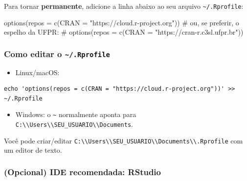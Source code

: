 \documentclass[
  letterpaper,
  DIV=11,
  numbers=noendperiod]{scrreprt}
\newenvironment{Shaded}{\begin{snugshade}}{\end{snugshade}}
\newcommand{\AttributeTok}[1]{\textcolor[rgb]{0.40,0.45,0.13}{#1}}
\newcommand{\CommentTok}[1]{\textcolor[rgb]{0.37,0.37,0.37}{#1}}
\newcommand{\FunctionTok}[1]{\textcolor[rgb]{0.28,0.35,0.67}{#1}}
\newcommand{\NormalTok}[1]{\textcolor[rgb]{0.00,0.23,0.31}{#1}}
\newcommand{\StringTok}[1]{\textcolor[rgb]{0.13,0.47,0.30}{#1}}
\providecommand{\tightlist}{%
  \setlength{\itemsep}{0pt}\setlength{\parskip}{0pt}}\usepackage{longtable,booktabs,array}
\begin{document}
Para tornar \textbf{permanente}, adicione a linha abaixo ao seu arquivo
\texttt{\textasciitilde{}/.Rprofile}:

\begin{Shaded}
\begin{Highlighting}[]
\FunctionTok{options}\NormalTok{(}\AttributeTok{repos =} \FunctionTok{c}\NormalTok{(}\AttributeTok{CRAN =} \StringTok{"https://cloud.r{-}project.org"}\NormalTok{))}
\CommentTok{\# ou, se preferir, o espelho da UFPR:}
\CommentTok{\# options(repos = c(CRAN = "https://cran{-}r.c3sl.ufpr.br"))}
\end{Highlighting}
\end{Shaded}

\subsubsection*{\texorpdfstring{Como editar o
\texttt{\textasciitilde{}/.Rprofile}}{Como editar o \textasciitilde/.Rprofile}}\label{como-editar-o-.rprofile}

\begin{itemize}
\tightlist
\item
  Linux/macOS:
\end{itemize}

\begin{verbatim}
echo 'options(repos = c(CRAN = "https://cloud.r-project.org"))' >> ~/.Rprofile
\end{verbatim}

\begin{itemize}
\tightlist
\item
  Windows: o \texttt{\textasciitilde{}} normalmente aponta para
  \texttt{C:\textbackslash{}\textbackslash{}Users\textbackslash{}\textbackslash{}SEU\_USUARIO\textbackslash{}\textbackslash{}Documents}.
\end{itemize}

Você pode criar/editar
\texttt{C:\textbackslash{}\textbackslash{}Users\textbackslash{}\textbackslash{}SEU\_USUARIO\textbackslash{}\textbackslash{}Documents\textbackslash{}\textbackslash{}.Rprofile}
com um editor de texto.

\subsubsection*{(Opcional) IDE recomendada:
RStudio}\label{opcional-ide-recomendada-rstudio}
\end{document}
